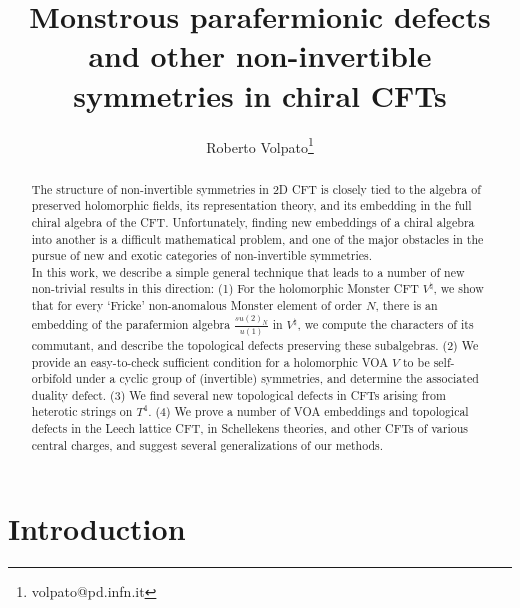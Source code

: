 \documentclass[11pt,reqno]{article}
\title{Monstrous parafermionic defects and other non-invertible symmetries in chiral CFTs}
\author{Roberto Volpato\thanks{volpato@pd.infn.it}}
\affil{\small Dipartimento di Fisica e Astronomia `Galileo Galilei', Universit\`a di Padova \\ INFN, sez. di Padova\\ Via Marzolo 8, 35131, Padova, Italy}
\begin{document}
\maketitle

\begin{abstract}
	The structure of non-invertible symmetries in 2D CFT is closely tied to the algebra of preserved holomorphic fields, its representation theory, and its embedding in the full chiral algebra of the CFT. Unfortunately, finding new embeddings of a chiral algebra into another is a difficult mathematical problem, and one of the major obstacles in the pursue of new and exotic categories of non-invertible symmetries.\\
	In this work, we describe a simple general technique that leads to a number of new non-trivial results in this direction: (1) For the holomorphic Monster CFT $V^\natural$, we show that for every `Fricke' non-anomalous Monster element of order $N$, there is an embedding of the parafermion algebra $\frac{su(2)_N}{u(1)}$ in $V^\natural$, we compute the characters of its commutant, and describe the topological defects preserving these subalgebras. (2) We provide an easy-to-check sufficient condition for a holomorphic VOA $V$ to be self-orbifold under a cyclic group of (invertible) symmetries, and determine the associated duality defect. (3) We find several new topological defects in CFTs arising from heterotic strings on $T^4$. (4) We prove a number of  VOA embeddings and topological defects in the Leech lattice CFT, in Schellekens theories, and other CFTs of various central charges, and suggest several generalizations of our methods.
\end{abstract}

\newpage
\tableofcontents

\section{Introduction}
\end{document}
